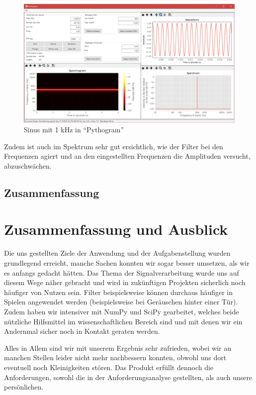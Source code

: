\documentclass[a4paper]{article}
\begin{document}
\begin{figure}[H]
    \centering
    \begin{minipage}{1.0\textwidth}
        \centering
        \includegraphics[width=1.0\textwidth]{Bandpass_Sine.png}
        \caption{Sinus mit 1 kHz in "`Pythogram"'}
    \end{minipage}
\end{figure}
\noindent
Zudem ist auch im Spektrum sehr gut ersichtlich, wie der Filter bei den Frequenzen agiert und an den eingestellten Frequenzen die Amplituden versucht, abzuschwächen.

\subsection{Zusammenfassung}\label{subsec:zusammenfassung2}

\newpage
\section{Zusammenfassung und Ausblick}\label{sec:zusammenfassungUndAusblick}

Die uns gestellten Ziele der Anwendung und der Aufgabenstellung wurden grundlegend erreicht, manche Sachen konnten wir sogar besser umsetzen, als wir es anfangs gedacht hätten. Das Thema der Signalverarbeitung wurde uns auf diesem Wege näher gebracht und wird in zukünftigen Projekten sicherlich noch häufiger von Nutzen sein. Filter beispielsweise können durchaus häufiger in Spielen angewendet werden (beispielsweise bei Geräuschen hinter einer Tür). Zudem haben wir intensiver mit NumPy und SciPy gearbeitet, welches beide nützliche Hilfsmittel im wissenschaftlichen Bereich sind und mit denen wir ein Andernmal sicher noch in Kontakt geraten werden.

Alles in Allem sind wir mit unserem Ergebnis sehr zufrieden, wobei wir an manchen Stellen leider nicht mehr nachbessern konnten, obwohl uns dort eventuell noch Kleinigkeiten stören. Das Produkt erfüllt dennoch die Anforderungen, sowohl die in der Anforderungsanalyse gestellten, als auch unsere persönlichen.
\end{document}
